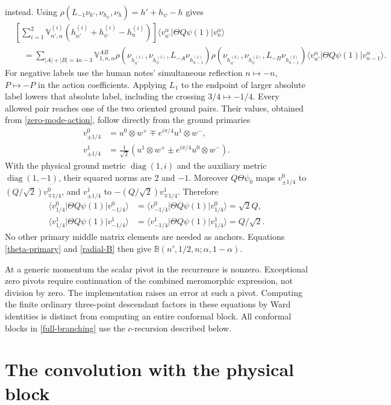 \documentclass[12pt]{article}
\newcommand{\ie}{\begin{equation}\begin{aligned}}
\newcommand{\fe}{\end{aligned}\end{equation}}
\numberwithin{equation}{section}
\begin{document}
instead.  Using
$\rho(L_{-1}\nu_{h'},\nu_{h_\psi},\nu_h)=h'+h_\psi-h$ gives
\begin{align}
 &\left[\sum_{i=1}^2\mathbb V_{n',\alpha}^{(i)}
 (h_{n'}^{(i)}+h_\psi^{(i)}-h_n^{(i)})\right]
 \langle v_{n'}^\alpha|\Theta Q\psi(1)|v_n^\alpha\rangle
 \nonumber\\
 &\quad=\sum_{|A|+|B|=4n-3}\mathbb V_{1,n,\alpha}^{AB}
 \rho(\nu_{h_{n'}^{(1)}},\nu_{h_\psi^{(1)}},L_{-A}\nu_{h_{n-1}^{(1)}})
 \rho(\nu_{h_{n'}^{(2)}},\nu_{h_\psi^{(2)}},L_{-B}\nu_{h_{n-1}^{(2)}})
 \langle v_{n'}^\alpha|\Theta Q\psi(1)|v_{n-1}^\alpha\rangle.
 \label{middle-recurrence-in}
\end{align}
For negative labels use the human notes' simultaneous reflection
$n\mapsto-n$, $P\mapsto-P$ in the action coefficients.  Applying $L_1$
to the endpoint of larger absolute label lowers that absolute label,
including the crossing $3/4\mapsto-1/4$.  Every allowed pair reaches
one of the two oriented ground pairs.  Their values, obtained from
\eqref{zero-mode-action}, follow directly from the ground primaries
\ie
 v_{\pm1/4}^0&=u^0\otimes w^+
 \mp e^{i\pi/4}u^1\otimes w^-,\\
 v_{\pm1/4}^1&=\frac1{\sqrt2}
 (u^1\otimes w^+\pm e^{i\pi/4}u^0\otimes w^-).
\fe
With the physical ground metric $\operatorname{diag}(1,i)$ and the
auxiliary metric $\operatorname{diag}(1,-1)$, their squared norms are
$2$ and $-1$.  Moreover $Q\Theta\psi_0$ maps $v_{\pm1/4}^0$ to
$(Q/\sqrt2)v_{\mp1/4}^0$, and $v_{\pm1/4}^1$ to
$-(Q/\sqrt2)v_{\mp1/4}^1$.  Therefore
\ie
 \langle v_{1/4}^0|\Theta Q\psi(1)|v_{-1/4}^0\rangle
 &=\langle v_{-1/4}^0|\Theta Q\psi(1)|v_{1/4}^0\rangle=\sqrt2Q,\\
 \langle v_{1/4}^1|\Theta Q\psi(1)|v_{-1/4}^1\rangle
 &=\langle v_{-1/4}^1|\Theta Q\psi(1)|v_{1/4}^1\rangle=Q/\sqrt2.
\fe
No other primary middle matrix elements are needed as anchors.
Equations \eqref{theta-primary} and \eqref{radial-B} then give
$\mathbb B(n',1/2,n;\alpha,1-\alpha)$.

At a generic momentum the scalar pivot in the recurrence is nonzero.
Exceptional zero pivots require continuation of the combined meromorphic
expression, not division by zero.  The implementation raises an error
at such a pivot.  Computing the finite ordinary three-point descendant
factors in these equations by Ward identities is distinct from computing
an entire conformal block.  All conformal blocks in
\eqref{full-branching} use the $c$-recursion described below.

\section{The convolution with the physical block}
\end{document}
